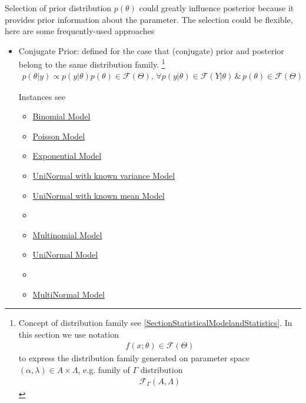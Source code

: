 Selection of prior distribution $ p(\theta ) $ could greatly influence posterior because it provides prior information about the parameter. The selection could be flexible, here are some frequently-used approaches
\begin{itemize}[topsep=2pt,itemsep=0pt]
    \item Conjugate Prior: defined for the case that (conjugate) prior and posterior belong to the same distribution family. 
    \footnote{Concept of distribution family see \autoref{SectionStatisticalModelandStatistics}. In this section we use notation 
    \begin{align*}
        f(x;\theta )\in\mathscr{F}(\Theta) 
    \end{align*}
    to express the distribution family generated on parameter space $ (\alpha ,\lambda )\in A\times \Lambda  $, e.g. family of $ \Gamma  $ distribution
    \begin{align*}
        \mathscr{F}_\Gamma (A,\Lambda ) 
    \end{align*}
    }
    \begin{align*}
        p(\theta |y)\propto p(y|\theta)p(\theta)\in \mathscr{F}(\Theta ) ,\,\forall p(y|\theta)\in\mathscr{F}{(Y|\theta) } \,\&\, p(\theta )\in\mathscr{F}(\Theta ) 
    \end{align*}

    Instances see 
    \begin{itemize}[topsep=2pt,itemsep=-1pt]
        \item \hyperlink{BinomConjugate}{Binomial Model}
        \item \hyperlink{PoissonConjugate}{Poisson Model}
        \item \hyperlink{ExpConjugate}{Exponential Model}
        \item \hyperlink{NormalWithVarConjugate}{UniNormal with known variance Model}
        \item \hyperlink{NormalWithMeanConjugate}{UniNormal with known mean Model}
        \item 
        \item \hyperlink{MultinomConjugate}{Multinomial Model}
        \item \hyperlink{NormalConjugate}{UniNormal Model}
        \item 
        \item \hyperlink{MultiNormalConjugate}{MultiNormal Model}
    \end{itemize}
\end{itemize}

